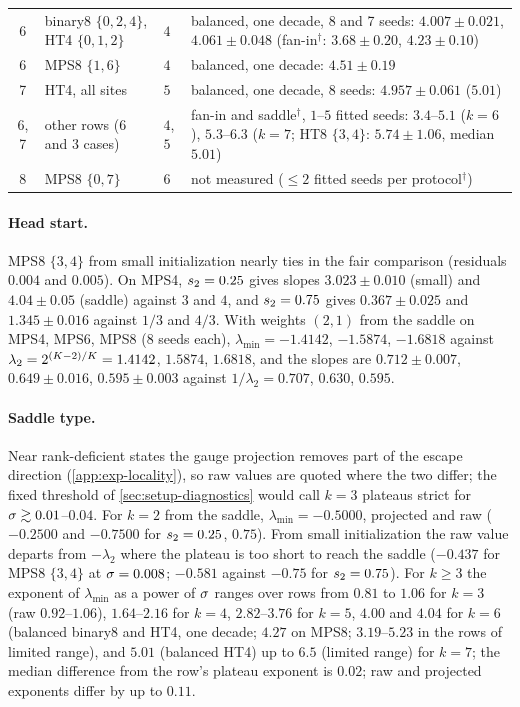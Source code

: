 \begin{table}[tbp]
\begin{tabularx}{\textwidth}{@{}c>{\raggedright\arraybackslash}p{3.0cm}
      >{\raggedright\arraybackslash}p{1.9cm}>{\raggedright\arraybackslash}X@{}}
    6 & binary8 $\{0,2,4\}$, HT4 $\{0,1,2\}$ & $4$ & balanced, one decade, 8 and 7 seeds:
      $4.007\pm0.021$, $4.061\pm0.048$ (fan-in$^\dagger$: $3.68\pm0.20$, $4.23\pm0.10$) \\
    6 & MPS8 $\{1,6\}$ & $4$ & balanced, one decade: $4.51\pm0.19$ \\
    7 & HT4, all sites & $5$ & balanced, one decade, 8 seeds: $4.957\pm0.061$ ($5.01$) \\
    6, 7 & other rows (6 and 3 cases) & $4$, $5$ & fan-in and saddle$^\dagger$, $1$--$5$ fitted seeds:
      $3.4$--$5.1$ ($k=6$), $5.3$--$6.3$ ($k=7$; HT8 $\{3,4\}$: $5.74\pm1.06$, median $5.01$) \\
    8 & MPS8 $\{0,7\}$ & $6$ & not measured ($\le2$ fitted seeds per protocol$^\dagger$) \\
    \bottomrule
  \end{tabularx}
\end{table}

\paragraph{Head start.}
\empirical{} MPS8 $\{3,4\}$ from small initialization nearly ties in the fair comparison (residuals $0.004$ and
$0.005$). On MPS4, $s_{2}=0.25$ gives slopes $3.023\pm0.010$ (small) and $4.04\pm0.05$ (saddle) against $3$ and $4$,
and $s_{2}=0.75$ gives $0.367\pm0.025$ and $1.345\pm0.016$ against $1/3$ and $4/3$. With weights $(2,1)$ from the
saddle on MPS4, MPS6, MPS8 (8 seeds each), $\lambda_{\min}=-1.4142$, $-1.5874$, $-1.6818$ against
$\lambda_2=2^{(K-2)/K}=1.4142$, $1.5874$, $1.6818$, and the slopes are $0.712\pm0.007$, $0.649\pm0.016$,
$0.595\pm0.003$ against $1/\lambda_2=0.707$, $0.630$, $0.595$.

\paragraph{Saddle type.}
\empirical{} Near rank-deficient states the gauge projection removes part of the escape direction
(\cref{app:exp-locality}), so raw values are quoted where the two differ; the fixed threshold of
\cref{sec:setup-diagnostics} would call $k=3$ plateaus strict for $\sigma\gtrsim0.01$--$0.04$. For $k=2$ from the
saddle, $\lambda_{\min}=-0.5000$, projected and raw ($-0.2500$ and $-0.7500$ for $s_{2}=0.25$, $0.75$). From small
initialization the raw value departs from $-\lambda_2$ where the plateau is too short to reach the saddle ($-0.437$
for MPS8 $\{3,4\}$ at $\sigma=0.008$; $-0.581$ against $-0.75$ for $s_{2}=0.75$). For $k\ge3$ the exponent of
$\lambda_{\min}$ as a power of $\sigma$ ranges over rows from $0.81$ to $1.06$ for $k=3$ (raw $0.92$--$1.06$), $1.64$--$2.16$ for
$k=4$, $2.82$--$3.76$ for $k=5$, $4.00$ and $4.04$ for $k=6$ (balanced binary8 and HT4, one decade; $4.27$ on MPS8;
$3.19$--$5.23$ in the rows of limited range), and $5.01$ (balanced HT4) up to $6.5$ (limited range) for $k=7$; the
median difference from the row's plateau exponent is $0.02$; raw and projected exponents differ by up to $0.11$.

